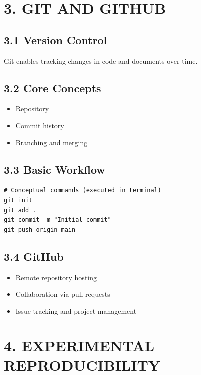 \vspace{0.5cm}

\section*{3. GIT AND GITHUB}

\subsection*{3.1 Version Control}

Git enables tracking changes in code and documents over time.

\subsection*{3.2 Core Concepts}

\begin{itemize}
\item Repository
\item Commit history
\item Branching and merging
\end{itemize}

\subsection*{3.3 Basic Workflow}

\begin{verbatim}
# Conceptual commands (executed in terminal)
git init
git add .
git commit -m "Initial commit"
git push origin main
\end{verbatim}

\subsection*{3.4 GitHub}

\begin{itemize}
\item Remote repository hosting
\item Collaboration via pull requests
\item Issue tracking and project management
\end{itemize}

\vspace{0.5cm}

\section*{4. EXPERIMENTAL REPRODUCIBILITY}

